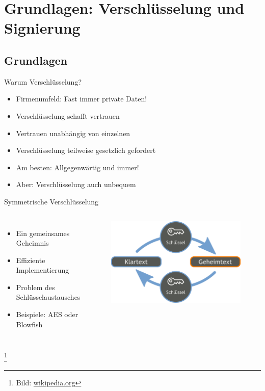 \documentclass[10pt]{beamer}
\newcommand\blfootnote[1]{%
	\begingroup
	\renewcommand\thefootnote{}\footnote{#1}%
	\addtocounter{footnote}{-1}%
	\endgroup
}
\begin{document}
\section{Grundlagen: Verschlüsselung und Signierung}

\subsection{Grundlagen}

\begin{frame}[fragile]{Warum Verschlüsselung?}
	\begin{itemize}
	\item Firmenumfeld: Fast immer private Daten!
	\item Verschlüsselung schafft vertrauen
	\item Vertrauen unabhängig von einzelnen
	\item Verschlüsselung teilweise gesetzlich gefordert
	\item Am besten: Allgegenwärtig und immer!
	\item Aber: Verschlüsselung auch unbequem
\end{itemize}
\end{frame}


\begin{frame}[fragile]{Symmetrische Verschlüsselung}

\begin{columns}[T,c,onlytextwidth]
	\begin{itemize}
		\item Ein gemeinsames Geheimnis
		\item Effiziente Implementierung
		\item Problem des Schlüsselaustausches
		\item Beispiele: AES oder Blowfish 
	\end{itemize}
	\begin{figure}
		\includegraphics[width=1\textwidth]{images/sym}
	\end{figure}
\end{columns}
\blfootnote{Bild: \href{https://de.wikipedia.org/wiki/Symmetrisches_Kryptosystem}{wikipedia.org}}
\end{frame}
\end{document}
